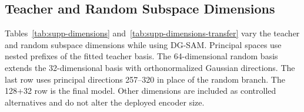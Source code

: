 \par\medskip\noindent\begin{minipage}{\columnwidth}
\captionsetup{type=table}
\centering
\caption{Stage II components at 128+32 with DG-SAM. Cells report D$\rightarrow$S R@1/AP (\%).}
\label{tab:supp-heads}
{\footnotesize\setlength{\tabcolsep}{2pt}\renewcommand{\arraystretch}{1.08}
}
\end{minipage}\par\medskip

\subsection{Teacher and Random Subspace Dimensions}
Tables~\ref{tab:supp-dimensions} and~\ref{tab:supp-dimensions-transfer} vary the teacher and random subspace dimensions while using DG-SAM. Principal spaces use nested prefixes of the fitted teacher basis. The 64-dimensional random basis extends the 32-dimensional basis with orthonormalized Gaussian directions. The last row uses principal directions 257--320 in place of the random branch. The 128+32 row is the final model. Other dimensions are included as controlled alternatives and do not alter the deployed encoder size.

